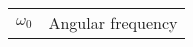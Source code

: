 \begin{table}[h]
    \begin{tabular}{@{}ll@{}}%
        \( \omega_0 \) & Angular frequency\\
    \end{tabular}
    \label{tab:glossar}
\end{table}